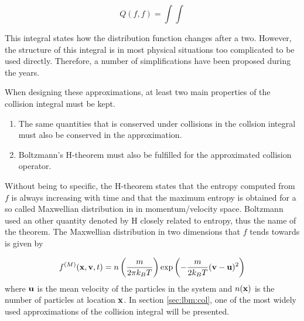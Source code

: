 \begin{equation}
Q(f, f) = \int \int
\end{equation}

This integral states how the distribution function changes after a two. However, the structure of this integral is in most physical
situations too complicated to be used directly. Therefore, a number of
simplifications have been proposed during the years.

When designing these approximations, at least two main properties of
the collision integral must be kept. \cite{wolf-gladrow}

\begin{enumerate}
  \item The same quantities that is conserved under collisions in the
    collsion integral must also be conserved in the approximation.
  \item Boltzmann's H-theorem must also be fulfilled for the
    approximated collision operator.
\end{enumerate}

Without being to specific, the H-theorem states that the entropy
computed from $f$ is always increasing with time and that the maximum
entropy is obtained for a so called Maxwellian distribution in in
momentum/velocity space. Boltzmann used an other quantity denoted by H
closely related to entropy, thus the name of the theorem. The
Maxwellian distribution in two dimensions that $f$ tends towards is
given by

\begin{equation}\label{eq:lbm:maxwell}
f^{(M)}(\mathbf{x}, \mathbf{v}, t) = n \left ( \frac{m}{2 \pi k_B T} \right )
\exp{\left( -\frac{m}{2 k_B T} (\mathbf{v} - \ensuremath{\mathbf{u}})^2\right)}
\end{equation} 
where $\mathbf{u}$ is the mean velocity of the particles in the system and
$n(\mathbf{x})$ is the number of particles at location $\mathbf{x}$. In section
\ref{sec:lbm:col}, one of the most widely used approximations of the
collision integral will be presented.

